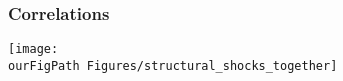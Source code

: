 \documentclass{beamer}
\def \ourFigPath {../../}
\begin{document}

\begin{frame}
\frametitle{Correlations}


\begin{center}
\texttt{[image: \\ourFigPath Figures/structural\_shocks\_together]}\\
\end{center}


\end{frame}


\end{document}

